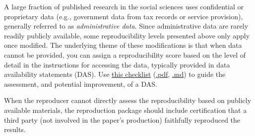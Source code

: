 \documentclass[
  openany]{book}
\begin{document}
A large fraction of published research in the social sciences uses confidential or proprietary data (e.g., government data from tax records or service provision), generally referred to as \emph{administrative data}. Since administrative data are rarely readily publicly available, some reproducibility levels presented above only apply once modified. The underlying theme of these modifications is that when data cannot be provided, you can assign a reproducibility score based on the level of detail in the instructions for accessing the data, typically provided in data availability statements (DAS). Use \href{sample-DAS.html}{this checklist} (\href{sample-DAS.pdf}{.pdf}, \href{https://github.com/BITSS/ACRE/blob/master/sample-DAS.md}{.md}) to guide the assessment, and potential improvement, of a DAS.

When the reproducer cannot directly assess the reproducibility based on publicly available materials, the reproduction package should include certification that a third party (not involved in the paper's production) faithfully reproduced the results.
\end{document}
